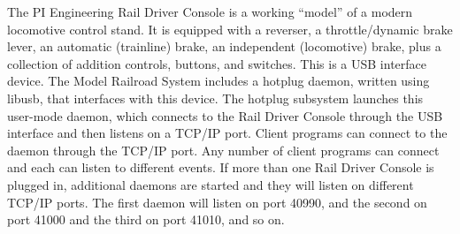 The PI Engineering Rail Driver Console is a working ``model'' of a
modern locomotive control stand.  It is equipped with a reverser, a
throttle/dynamic brake lever, an automatic (trainline) brake, an
independent (locomotive) brake, plus a collection of addition controls,
buttons, and switches.  This is a USB interface device.  The Model
Railroad System includes a hotplug daemon,
written using libusb, that interfaces with this device.  The hotplug
subsystem launches this user-mode daemon, which connects to the Rail Driver Console through the USB
interface and then listens on a TCP/IP port.  Client programs can
connect to the daemon through the TCP/IP port.  Any number of client
programs can connect and each can listen to different events.  If more
than one Rail Driver Console is plugged in, additional daemons are
started and they will listen on different TCP/IP ports. The first
daemon will listen on port 40990, and the second on port 41000 and the
third on port 41010, and so on.


